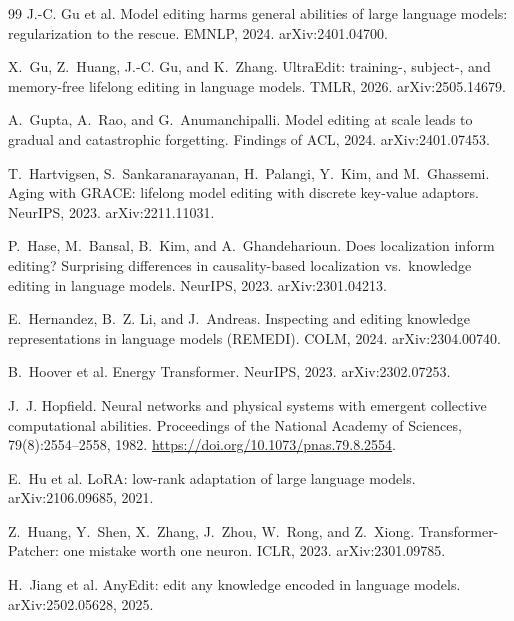 \documentclass[11pt]{article}
\theoremstyle{remark}
\begin{document}
\begin{thebibliography}{99}
J.-C. Gu et al.
\newblock Model editing harms general abilities of large language models: regularization to the rescue.
\newblock EMNLP, 2024. arXiv:2401.04700.

X.~Gu, Z.~Huang, J.-C. Gu, and K.~Zhang.
\newblock UltraEdit: training-, subject-, and memory-free lifelong editing in language models.
\newblock TMLR, 2026. arXiv:2505.14679.

A.~Gupta, A.~Rao, and G.~Anumanchipalli.
\newblock Model editing at scale leads to gradual and catastrophic forgetting.
\newblock Findings of ACL, 2024. arXiv:2401.07453.

T.~Hartvigsen, S.~Sankaranarayanan, H.~Palangi, Y.~Kim, and M.~Ghassemi.
\newblock Aging with GRACE: lifelong model editing with discrete key-value adaptors.
\newblock NeurIPS, 2023. arXiv:2211.11031.

P.~Hase, M.~Bansal, B.~Kim, and A.~Ghandeharioun.
\newblock Does localization inform editing? Surprising differences in causality-based localization vs.\ knowledge editing in language models.
\newblock NeurIPS, 2023. arXiv:2301.04213.

E.~Hernandez, B.~Z. Li, and J.~Andreas.
\newblock Inspecting and editing knowledge representations in language models (REMEDI).
\newblock COLM, 2024. arXiv:2304.00740.

B.~Hoover et al.
\newblock Energy Transformer.
\newblock NeurIPS, 2023. arXiv:2302.07253.

J.~J. Hopfield.
\newblock Neural networks and physical systems with emergent collective computational abilities.
\newblock Proceedings of the National Academy of Sciences, 79(8):2554--2558, 1982. \url{https://doi.org/10.1073/pnas.79.8.2554}.

E.~Hu et al.
\newblock LoRA: low-rank adaptation of large language models.
\newblock arXiv:2106.09685, 2021.

Z.~Huang, Y.~Shen, X.~Zhang, J.~Zhou, W.~Rong, and Z.~Xiong.
\newblock Transformer-Patcher: one mistake worth one neuron.
\newblock ICLR, 2023. arXiv:2301.09785.

H.~Jiang et al.
\newblock AnyEdit: edit any knowledge encoded in language models.
\newblock arXiv:2502.05628, 2025.


\end{thebibliography}
\end{document}
